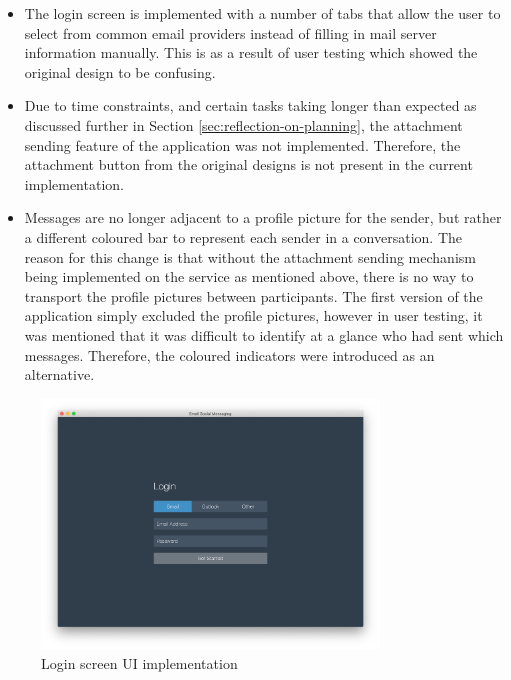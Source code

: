 \begin{itemize}
  \item The login screen is implemented with a number of tabs that allow the user to select from common email providers instead of filling in mail server information manually. This is as a result of user testing which showed the original design to be confusing.
  \item Due to time constraints, and certain tasks taking longer than expected as discussed further in Section \ref{sec:reflection-on-planning}, the attachment sending feature of the application was not implemented. Therefore, the attachment button from the original designs is not present in the current implementation.
  \item Messages are no longer adjacent to a profile picture for the sender, but rather a different coloured bar to represent each sender in a conversation. The reason for this change is that without the attachment sending mechanism being implemented on the service as mentioned above, there is no way to transport the profile pictures between participants. The first version of the application simply excluded the profile pictures, however in user testing, it was mentioned that it was difficult to identify at a glance who had sent which messages. Therefore, the coloured indicators were introduced as an alternative.
\end{itemize}

\begin{figure}[h!]
  \centering
  \includegraphics[width=0.8\textwidth]{images/implementation-login.png}
  \caption{Login screen UI implementation}
  \label{fig:main-ui}
\end{figure}

